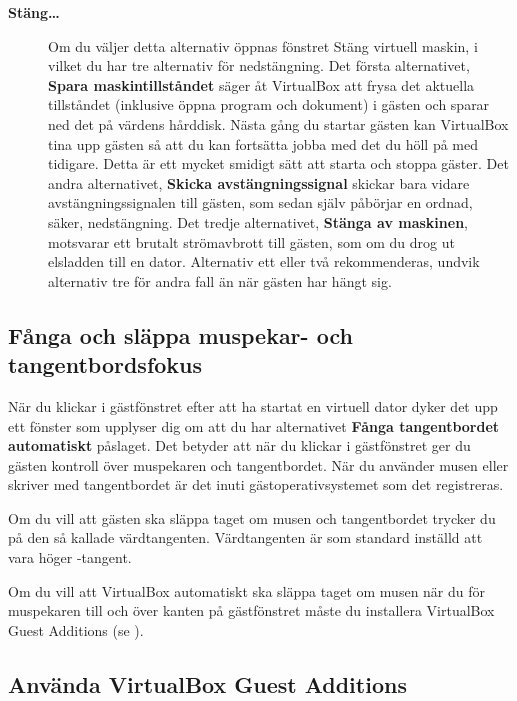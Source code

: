 \documentclass[a4paper,final]{memoir} %
\begin{document}
\begin{description}
\item[\textbf{Stäng\ldots{}}] Om du väljer detta alternativ öppnas fönstret Stäng virtuell maskin, i vilket du har tre alternativ för nedstängning. Det första alternativet, \textbf{Spara maskintillståndet} säger åt VirtualBox att frysa det aktuella tillståndet (inklusive öppna program och dokument) i gästen och sparar ned det på värdens hårddisk. Nästa gång du startar gästen kan VirtualBox tina upp gästen så att du kan fortsätta jobba med det du höll på med tidigare. Detta är ett mycket smidigt sätt att starta och stoppa gäster. Det andra alternativet, \textbf{Skicka avstängningssignal} skickar bara vidare avstängningssignalen till gästen, som sedan själv påbörjar en ordnad, säker, nedstängning. Det tredje alternativet, \textbf{Stänga av maskinen}, motsvarar ett brutalt strömavbrott till gästen, som om du drog ut elsladden till en dator. Alternativ ett eller två rekommenderas, undvik alternativ tre för andra fall än när gästen har hängt sig.

\end{description}

\subsection{Fånga och släppa muspekar- och tangentbordsfokus}


När du klickar i gästfönstret efter att ha startat en virtuell dator dyker det upp ett fönster som upplyser dig om att du har alternativet \textbf{Fånga tangentbordet automatiskt} påslaget. Det betyder att när du klickar i gästfönstret ger du gästen kontroll över muspekaren och tangentbordet. När du använder musen eller skriver med tangentbordet är det inuti gästoperativsystemet som det registreras.

Om du vill att gästen ska släppa taget om musen och tangentbordet trycker du på den så kallade värdtangenten. Värdtangenten är som standard inställd att vara höger -tangent.

Om du vill att VirtualBox automatiskt ska släppa taget om musen när du för muspekaren till och över kanten på gästfönstret måste du installera VirtualBox Guest Additions (se ).

\subsection{Använda VirtualBox Guest Additions}\label{virtualbox-additions}
\end{document}
